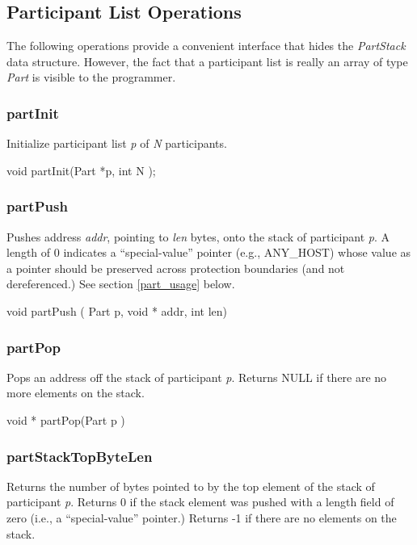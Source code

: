 \subsection{Participant List Operations}

The following operations provide a convenient interface that hides the
{\em PartStack} data structure. However, the fact that a participant
list is really an array of type {\em Part} is visible to the
programmer.

\subsubsection{partInit}
Initialize participant list {\em p} of {\em N} participants.\medskip

{\sem void} {\bold partInit}({\sem  Part *}{\caps p}, {\sem int} {\caps N} );
\medskip

\subsubsection{partPush}
Pushes address {\em addr}, pointing to {\em len} bytes, onto the 
stack of participant {\em p}.   A length of 0 indicates a ``special-value''
pointer (e.g., ANY\_HOST) whose value as a
pointer should be preserved across protection boundaries (and not
dereferenced.)  See section \ref{part_usage} below.

\medskip

{\sem void} {\bold partPush}
( {\sem Part } {\caps p}, {\sem void *} {\caps addr}, {\sem int} {\caps len})
\medskip

\subsubsection{partPop}
Pops an address off the stack of participant {\em p}.  Returns NULL if
there are no more elements on the stack.
\medskip

{\sem void *} {\bold partPop}({\sem Part }{\caps p} )
\medskip


\subsubsection{partStackTopByteLen}
Returns the number of bytes pointed to by the top element of the stack
of participant {\em p}.  Returns 0 if the stack element was pushed
with a length field of zero (i.e., a ``special-value'' pointer.)
Returns -1 if there are no elements on the stack.
\medskip


